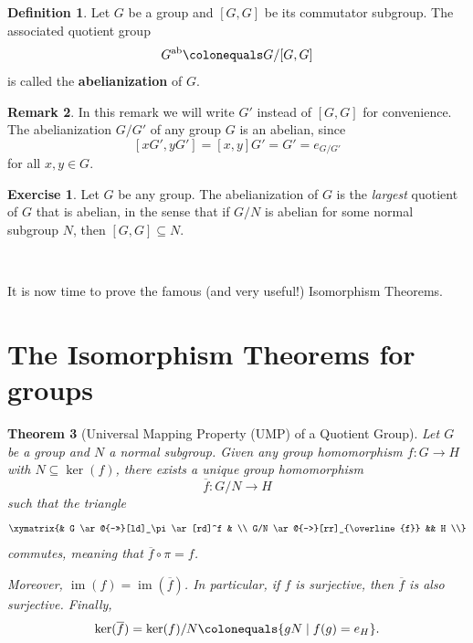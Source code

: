 \documentclass[12pt]{report}
\newtheorem{theorem}{Theorem}[chapter]
\numberwithin{equation}{section}
\numberwithin{theorem}{chapter}
\theoremstyle{definition}
\newtheorem{definition}[theorem]{Definition}
\newtheorem{exercise}{Exercise}
\newtheorem*{basic properties}{Basic Properties}
\newtheorem*{Important Remark}{Important Remark}
\newtheorem{remark}[theorem]{Remark}
\newcommand{\df}[1]{{\bf #1}\index{#1}}
\renewcommand{\ker}{\operatorname{ker}}
\DeclareMathOperator{\im}{im}
\begin{document}
  
\begin{definition}\label{abelianization of a group}
Let $G$ be a group and $[G,G]$ be its commutator subgroup. The associated quotient group 
$$G^{\textrm{ab}} \colonequals G/[G,G]$$ 
is called the \df{abelianization} of $G$.
\end{definition}  


\begin{remark}
In this remark we will write $G'$ instead of $[G,G]$ for convenience.
The abelianization $G/G'$ of any group $G$ is an abelian, since 
$$[xG', yG'] = [x,y]G' = G' = e_{G/G'}$$ 
for all $x,y \in G$.
\end{remark}

\begin{exercise}
	Let $G$ be any group. The abelianization of $G$ is the \emph{largest} quotient of $G$ that is abelian, in the sense that if $G/N$ is abelian for some normal subgroup $N$, then $[G,G] \subseteq N$.
\end{exercise}


\


It is now time to prove the famous (and very useful!) Isomorphism Theorems.


\section{The Isomorphism Theorems for groups}



\begin{theorem}[Universal Mapping Property (UMP) of a Quotient Group]\label{UMP quotient group}
Let $G$ be a group and $N$ a normal subgroup. Given any group homomorphism $f\!: G \to H$ with $N \subseteq \ker(f)$, there exists a unique group homomorphism 
$$\overline{f}: G/N \to H$$ 
such that the triangle
$$\xymatrix{& G \ar@{->>}[ld]_\pi \ar[rd]^f  & \\
G/N \ar@{-->}[rr]_{\overline{f}}  && H \\}$$
commutes, meaning that $\overline{f} \circ \pi = f$.

\vspace{0.5em}

Moreover, $\im(f) = \im(\overline{f})$. In particular, if $f$ is surjective, then $\overline{f}$ is also surjective. Finally,
$$\ker(\overline{f}) = \ker(f)/N \colonequals \{ g N \mid f(g) = e_H\}.$$
\end{theorem}
\end{document}
